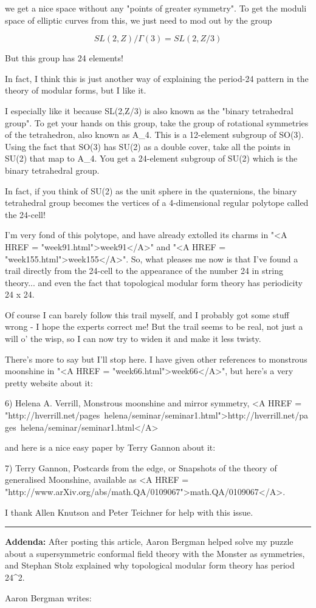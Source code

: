 we get a nice space without any "points of greater symmetry".
To get the moduli space of elliptic curves from this, we just 
need to mod out by the group 

$$
SL(2,Z)/\Gamma (3) = SL(2,Z/3)
$$
    
But this group has 24 elements!

In fact, I think this is just another way of explaining the 
period-24 pattern in the theory of modular forms, but I like
it.  

I especially like it because SL(2,Z/3) is also known as the 
"binary tetrahedral group".  To get your hands on this group,
take the group of rotational symmetries of the tetrahedron,
also known as A_{4}.  This is a 12-element subgroup of SO(3).  
Using the fact that SO(3) has SU(2) as a double cover, take 
all the points in SU(2) that map to A_{4}.  You get a 24-element
subgroup of SU(2) which is the binary tetrahedral group.

In fact, if you think of SU(2) as the unit sphere in the
quaternions, the binary tetrahedral group becomes the vertices
of a 4-dimensional regular polytope called the 24-cell!

I'm very fond of this polytope, and have already extolled its 
charms in "<A HREF = "week91.html">week91</A>" and
 "<A HREF = "week155.html">week155</A>".   So, what 
pleases me now
is that I've found a trail directly from the 24-cell to the
appearance of the number 24 in string theory... and even the
fact that topological modular form theory has periodicity 24 x 24.

Of course I can barely follow this trail myself, and I probably
got some stuff wrong - I hope the experts correct
me!  But the trail seems to be real, not just a will o' the wisp, 
so I can now try to widen it and make it less twisty.

There's more to say but I'll stop here.  I have given other 
references to monstrous moonshine in "<A HREF = "week66.html">week66</A>", but here's a 
very pretty website about it:

6) Helena A. Verrill, Monstrous moonshine and mirror symmetry, 
<A HREF = "http://hverrill.net/pages~helena/seminar/seminar1.html">http://hverrill.net/pages~helena/seminar/seminar1.html</A>

and here is a nice easy paper by Terry Gannon about it:

7) Terry Gannon, Postcards from the edge, or Snapshots of the 
theory of generalised Moonshine, available as <A HREF = 
"http://www.arXiv.org/abs/math.QA/0109067">math.QA/0109067</A>.

I thank Allen Knutson and Peter Teichner for help with
this issue.      
\par\noindent\rule{\textwidth}{0.4pt}
\textbf{Addenda:} After posting this article, Aaron Bergman helped 
solve my puzzle about a supersymmetric conformal field theory with 
the Monster as symmetries, and Stephan Stolz explained why
topological modular form theory has period 24^{2}. 

Aaron Bergman writes:


